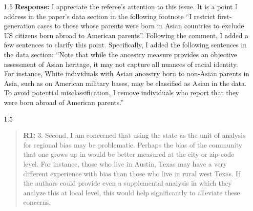 \documentclass[12pt,english]{article}
\newcommand{\rrxspc}{1.5}
\begin{document}
\begin{refsection}
    \begin{spacing}{\rrxspc}
        \textbf{Response:} I appreciate the referee's attention to this issue. It is a point I address in the paper's data section in the following footnote ``I restrict first-generation cases to those whose parents were born in Asian countries to exclude US citizens born abroad to American parents''. Following the comment, I added a few sentences to clarify this point. Specifically, I added the following sentences in the data section: ``Note that while the ancestry measure provides an objective assessment of Asian heritage, it may not capture all nuances of racial identity. For instance, White individuals with Asian ancestry born to non-Asian parents in Asia, such as on American military bases, may be classified as Asian in the data. To avoid potential misclassification, I remove individuals who report that they were born abroad of American parents.''
    \end{spacing}    

    \begin{spacing}{\rrxspc}
        \begin{quotation}
            \textbf{R1: } 3. Second, I am concerned that using the state as the unit of analysis for regional bias may be problematic. Perhaps the bias of the community that one grows up in would be better measured at the city or zip-code level. For instance, those who live in Austin, Texas may have a very different experience with bias than those who live in rural west Texas. If the authors could provide even a supplemental analysis in which they analyze this at local level, this would help significantly to alleviate these concerns.
    \end{quotation}
        \end{spacing}
            

\end{refsection}
\end{document}
